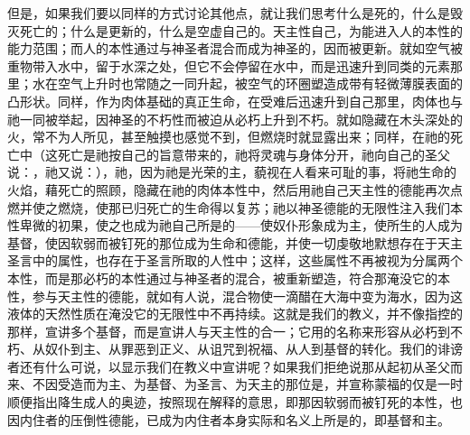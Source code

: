 但是，如果我们要以同样的方式讨论其他点，就让我们思考什么是死的，什么是毁灭死亡的；什么是更新的，什么是空虚自己的。天主性自己，为能进入人的本性的能力范围；而人的本性通过与神圣者混合而成为神圣的，因而被更新。就如空气被重物带入水中，留于水深之处，但它不会停留在水中，而是迅速升到同类的元素那里；水在空气上升时也常随之一同升起，被空气的环圈塑造成带有轻微薄膜表面的凸形状。同样，作为肉体基础的真正生命，在受难后迅速升到自己那里，肉体也与祂一同被举起，因神圣的不朽性而被迫从必朽上升到不朽。就如隐藏在木头深处的火，常不为人所见，甚至触摸也感觉不到，但燃烧时就显露出来；同样，在祂的死亡中（这死亡是祂按自己的旨意带来的，祂将灵魂与身体分开，祂向自己的圣父说：，祂又说：），祂，因为祂是光荣的主，藐视在人看来可耻的事，将祂生命的火焰，藉死亡的照顾，隐藏在祂的肉体本性中，然后用祂自己天主性的德能再次点燃并使之燃烧，使那已归死亡的生命得以复苏；祂以神圣德能的无限性注入我们本性卑微的初果，使之也成为祂自己所是的——使奴仆形象成为主，使所生的人成为基督，使因软弱而被钉死的那位成为生命和德能，并使一切虔敬地默想存在于天主圣言中的属性，也存在于圣言所取的人性中；这样，这些属性不再被视为分属两个本性，而是那必朽的本性通过与神圣者的混合，被重新塑造，符合那淹没它的本性，参与天主性的德能，就如有人说，混合物使一滴醋在大海中变为海水，因为这液体的天然性质在淹没它的无限性中不再持续。这就是我们的教义，并不像指控的那样，宣讲多个基督，而是宣讲人与天主性的合一；它用的名称来形容从必朽到不朽、从奴仆到主、从罪恶到正义、从诅咒到祝福、从人到基督的转化。我们的诽谤者还有什么可说，以显示我们在教义中宣讲呢？如果我们拒绝说那从起初从圣父而来、不因受造而为主、为基督、为圣言、为天主的那位是，并宣称蒙福的仅是一时顺便指出降生成人的奥迹，按照现在解释的意思，即那因软弱而被钉死的本性，也因内住者的压倒性德能，已成为内住者本身实际和名义上所是的，即基督和主。\par



\section{}

